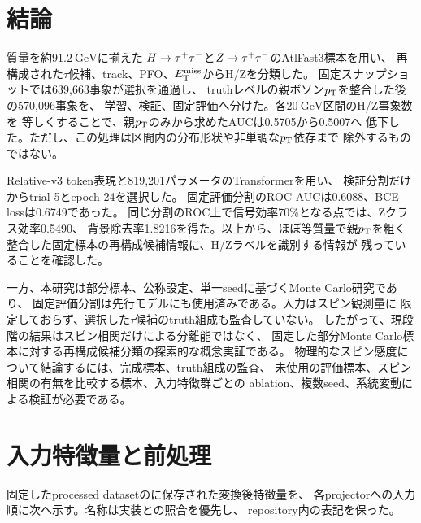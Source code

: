 \documentclass[xelatex,ja=standard,a4paper,10pt,twocolumn]{bxjsarticle}
\begin{document}
\section{結論}
\label{sec:conclusion}

質量を約\(\SI{91.2}{\GeV}\)に揃えた
\(H\rightarrow\tau^{+}\tau^{-}\)と\(Z\rightarrow\tau^{+}\tau^{-}\)のAtlFast3標本を用い、
再構成された\(\tau\)候補、track、PFO、\(E_{\mathrm{T}}^{\mathrm{miss}}\)からH/Zを分類した。
固定スナップショットでは639,663事象が選択を通過し、
truthレベルの親ボソン\(p_{\mathrm{T}}\)を整合した後の570,096事象を、
学習、検証、固定評価へ分けた。各\(\SI{20}{\GeV}\)区間のH/Z事象数を
等しくすることで、親\(p_{\mathrm{T}}\)のみから求めたAUCは0.5705から0.5007へ
低下した。ただし、この処理は区間内の分布形状や非単調な\(p_{\mathrm{T}}\)依存まで
除外するものではない。

Relative-v3 token表現と819,201パラメータのTransformerを用い、
検証分割だけからtrial 5とepoch 24を選択した。
固定評価分割のROC AUCは0.6088、BCE lossは0.6749であった。
同じ分割のROC上で信号効率70\%となる点では、Zクラス効率0.5490、
背景除去率1.8216を得た。以上から、ほぼ等質量で親\(p_{\mathrm{T}}\)を粗く
整合した固定標本の再構成候補情報に、H/Zラベルを識別する情報が
残っていることを確認した。

一方、本研究は部分標本、公称設定、単一seedに基づくMonte Carlo研究であり、
固定評価分割は先行モデルにも使用済みである。入力はスピン観測量に
限定しておらず、選択した\(\tau\)候補のtruth組成も監査していない。
したがって、現段階の結果はスピン相関だけによる分離能ではなく、
固定した部分Monte Carlo標本に対する再構成候補分類の探索的な概念実証である。
物理的なスピン感度について結論するには、完成標本、truth組成の監査、
未使用の評価標本、スピン相関の有無を比較する標本、入力特徴群ごとの
ablation、複数seed、系統変動による検証が必要である。

\FloatBarrier
\appendix

\section{入力特徴量と前処理}
\label{app:features}

固定したprocessed datasetのに保存された変換後特徴量を、
各projectorへの入力順に次へ示す。名称は実装との照合を優先し、
repository内の表記を保った。
\end{document}
